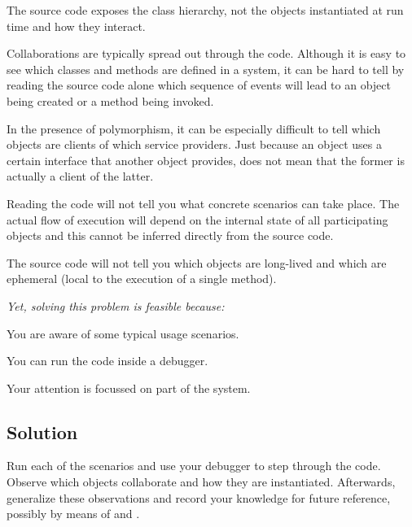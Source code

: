 \documentclass[a4paper,10pt,twoside]{book}
\begin{document}
\begin{bulletlist}
\item The source code exposes the class hierarchy, not the objects instantiated at run time and how they interact.

\item Collaborations are typically spread out through the code. Although it is easy to see which classes and methods are defined in a system, it can be hard to tell by reading the source code alone which sequence of events will lead to an object being created or a method being invoked.

\item In the presence of polymorphism, it can be especially difficult to tell which objects are clients of which service providers. Just because an object uses a certain interface that another object provides, does not mean that the former is actually a client of the latter.

\item Reading the code will not tell you what concrete scenarios can take place. The actual flow of execution will depend on the internal state of all participating objects and this cannot be inferred directly from the source code.

\item The source code will not tell you which objects are long-lived and which are ephemeral (\ie local to the execution of a single method).
\end{bulletlist}

\emph{Yet, solving this problem is feasible because:}

\begin{bulletlist}
\item You are aware of some typical usage scenarios.

\item You can run the code inside a debugger.

\item Your attention is focussed on part of the system.
\end{bulletlist}

\subsection*{Solution}

Run each of the scenarios and use your debugger to step through the code. Observe which objects collaborate and how they are instantiated. Afterwards, generalize these observations and record your knowledge for future reference, possibly by means of  and .
\end{document}
